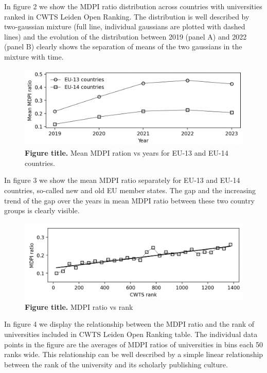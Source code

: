 \documentclass[amsfonts, amssymb, prl, superscriptaddress, notitlepage, twocolumn, nofootinbib]{revtex4-2}
\begin{document}
In figure 2 we show the MDPI ratio distribution across countries with universities ranked in CWTS Leiden Open Ranking. The distribution is well described by two-gaussian mixture (full line, individual gaussians  are plotted with dashed lines) and the evolution of the distribution between 2019 (panel A) and 2022 (panel B) clearly shows the separation of means of the two gaussians in the mixture with time.  

\begin{figure}
    \centering
    \includegraphics[width=1.0\linewidth]{Fig01a.png}
    \caption{\label{fig:fig3} {\bf Figure title.} Mean MDPI ration vs years for EU-13 and EU-14 countries.  
}
\end{figure}

In figure 3 we show the mean MDPI ratio separately for EU-13 and EU-14 countries, so-called new and old EU member states. The
gap and the increasing trend of the gap over the years in mean MDPI ratio between these two country groups is clearly visible. 

\begin{figure}
    \centering
    \includegraphics[width=1.0\linewidth]{Fig03.png}
    \caption{\label{fig:fig3} {\bf Figure title.} MDPI ratio vs rank  
}
\end{figure}

In figure 4 we display the relationship between the MDPI ratio and the rank of universities included in CWTS Leiden Open Ranking table. The individual data points in the figure are the averages of MDPI ratios of universities in bins each 50 ranks wide. This relationship can be well described by a simple linear relationship between the rank of the university and its scholarly publishing culture.  
\end{document}
